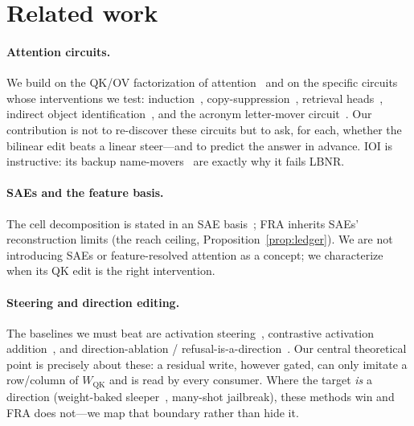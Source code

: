 \documentclass[11pt]{article}
\newcommand{\QK}{\mathrm{QK}}
\theoremstyle{definition}
\theoremstyle{plain}
\theoremstyle{remark}
\begin{document}
\section{Related work}\label{sec:related}

\paragraph{Attention circuits.} We build on the QK/OV factorization of attention~\citep{elhage2021mathematical} and on the specific circuits whose interventions we test: induction~\citep{olsson2022induction}, copy-suppression~\citep{mcdougall2023copysuppression}, retrieval heads~\citep{wu2024retrieval}, indirect object identification~\citep{wang2022ioi}, and the acronym letter-mover circuit~\citep{garciacarrasco2024acronym}. Our contribution is not to re-discover these circuits but to ask, for each, whether the bilinear edit beats a linear steer---and to predict the answer in advance. IOI is instructive: its backup name-movers~\citep{wang2022ioi} are exactly why it fails LBNR.

\paragraph{SAEs and the feature basis.} The cell decomposition is stated in an SAE basis~\citep{bricken2023monosemanticity,cunningham2023sparse,templeton2024scaling}; FRA inherits SAEs' reconstruction limits (the reach ceiling, Proposition~\ref{prop:ledger}). We are not introducing SAEs or feature-resolved attention as a concept; we characterize when its QK edit is the right intervention.

\paragraph{Steering and direction editing.} The baselines we must beat are activation steering~\citep{turner2023actadd}, contrastive activation addition~\citep{rimsky2024caa}, and direction-ablation / refusal-is-a-direction~\citep{arditi2024refusal}. Our central theoretical point is precisely about these: a residual write, however gated, can only imitate a row/column of $W_{\QK}$ and is read by every consumer. Where the target \emph{is} a direction (weight-baked sleeper~\citep{hubinger2024sleeper}, many-shot jailbreak), these methods win and FRA does not---we map that boundary rather than hide it.
\end{document}
